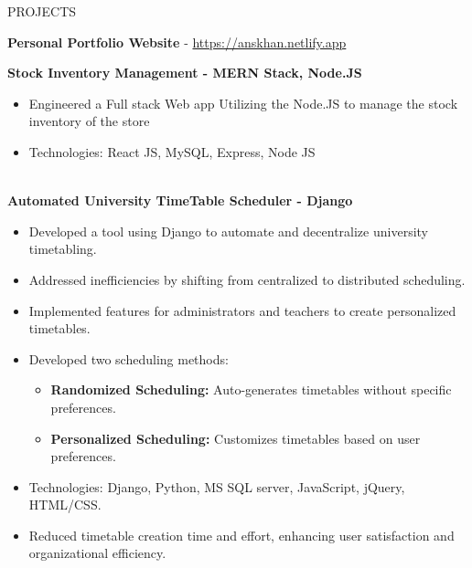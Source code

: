 \documentclass{resume} %
\begin{document}
\begin{rSection}{PROJECTS}
\vspace{-1.25em}
\item \textbf{Personal Portfolio Website}  - \href{https://anskhan.netlify.app}{https://anskhan.netlify.app}

\textbf {Stock Inventory Management - MERN Stack, Node.JS}

\begin{itemize}
	\item {Engineered a Full stack Web app Utilizing the Node.JS to manage the stock inventory of the store}
	\item {Technologies: React JS, MySQL, Express, Node JS} \\ \\
\end{itemize}


\item \textbf{Automated University TimeTable Scheduler - Django}

\iffalse


 {Built a tool to easify the hectic and stressfull process of organization timetabling. Problem needed to solve was to make the process distributed instead of the current centralised timetable scheduling process. Keeping provided features for admin and teachers to solve the problem and create personalized timetables. Implemented two ways to get the final scheduled timetable, i.e. Randomised and personalized timetables}
 
\fi
 
 \begin{itemize}
 	\item Developed a tool using Django to automate and decentralize university timetabling.
 	\item Addressed inefficiencies by shifting from centralized to distributed scheduling.
 	\item Implemented features for administrators and teachers to create personalized timetables.
 	\item Developed two scheduling methods:
 	\begin{itemize}
 		\item \textbf{Randomized Scheduling:} Auto-generates timetables without specific preferences.
 		\item \textbf{Personalized Scheduling:} Customizes timetables based on user preferences.
 	\end{itemize}
 	\item Technologies: Django, Python, MS SQL server, JavaScript, jQuery, HTML/CSS.
 	\item Reduced timetable creation time and effort, enhancing user satisfaction and organizational efficiency.
 \end{itemize}
 

\end{rSection}
\end{document}
